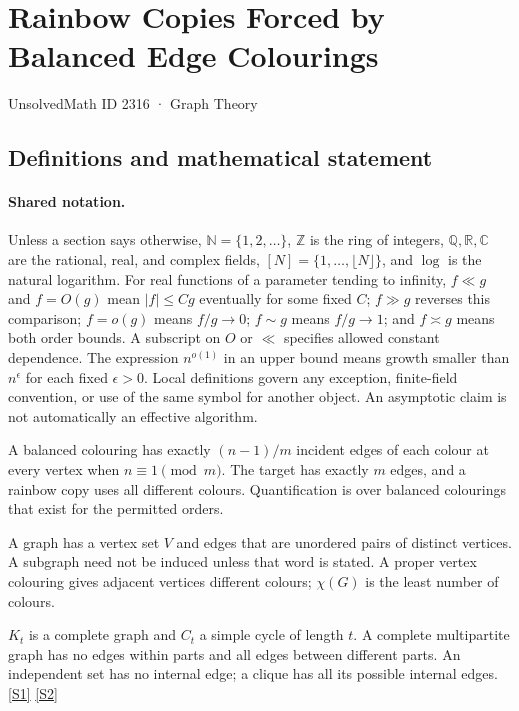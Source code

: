 \documentclass[11pt,a4paper]{article}
\newcommand{\N}{\mathbb{N}}
\newcommand{\Z}{\mathbb{Z}}
\newcommand{\Q}{\mathbb{Q}}
\newcommand{\R}{\mathbb{R}}
\newcommand{\C}{\mathbb{C}}
\newcommand{\sref}[2]{\hyperlink{source:#1:#2}{[S#2]}}
\begin{document}

\setcounter{section}{2315}

\section{Rainbow Copies Forced by Balanced Edge Colourings}\label{2316}

{\small\sffamily UnsolvedMath ID 2316 · Graph Theory}

\subsection{Definitions and mathematical statement}

\paragraph{Shared notation.}Unless a section says otherwise, $\N=\{1,2,\ldots\}$,
$\Z$ is the ring of integers, $\Q,\R,\C$ are the rational, real, and complex
fields, $[N]=\{1,\ldots,\lfloor N\rfloor\}$, and $\log$ is the natural
logarithm. For real functions of a parameter tending to infinity,
$f\ll g$ and $f=O(g)$ mean $|f|\leq Cg$ eventually for some fixed $C$;
$f\gg g$ reverses this comparison; $f=o(g)$ means $f/g\to0$;
$f\sim g$ means $f/g\to1$; and $f\asymp g$ means both order bounds.
A subscript on $O$ or $\ll$ specifies allowed constant dependence.
The expression $n^{o(1)}$ in an upper bound means growth smaller than
$n^\epsilon$ for each fixed $\epsilon>0$. Local definitions govern any
exception, finite-field convention, or use of the same symbol for another
object. An asymptotic claim is not automatically an effective algorithm.



A balanced colouring has exactly $(n-1)/m$ incident edges of each colour at every vertex when $n\equiv1\pmod m$. The target has exactly $m$ edges, and a rainbow copy uses all different colours. Quantification is over balanced colourings that exist for the permitted orders.

A graph has a vertex set $V$ and edges that are unordered pairs of distinct vertices. A subgraph need not be induced unless that word is stated. A proper vertex colouring gives adjacent vertices different colours; $\chi(G)$ is the least number of colours.

$K_t$ is a complete graph and $C_t$ a simple cycle of length $t$. A complete multipartite graph has no edges within parts and all edges between different parts. An independent set has no internal edge; a clique has all its possible internal edges. \sref{2316}{1} \sref{2316}{2}
\end{document}
